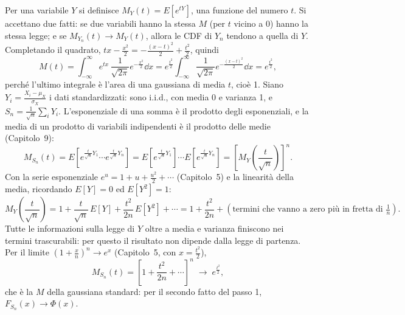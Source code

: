 \begin{dimostrazione}
 Per una variabile $Y$ si definisce $M_Y(t) = E\left[ e^{tY}
\right]$, una funzione del numero $t$. Si accettano due fatti: se due variabili hanno la stessa $M$ (per $t$ vicino a
0) hanno la stessa legge; e se $M_{Y_n}(t) \to M_Y(t)$, allora le CDF di $Y_n$ tendono a quella di $Y$.
 Completando il quadrato, $tx - \frac{x^2}{2} = -\frac{(x - t)^2}{2} +
\frac{t^2}{2}$, quindi
\[ M(t) = \int_{-\infty}^{\infty} e^{tx}\, \frac{1}{\sqrt{2\pi}} e^{-\frac{x^2}{2}} \dd x = e^{\frac{t^2}{2}}
   \int_{-\infty}^{\infty} \frac{1}{\sqrt{2\pi}} e^{-\frac{(x - t)^2}{2}} \dd x = e^{\frac{t^2}{2}} , \]
perché l'ultimo integrale è l'area di una gaussiana di media $t$, cioè 1.
 Siano $Y_i = \frac{X_i - \mu_X}{\sigma_X}$ i dati standardizzati: sono i.i.d., con media 0 e
varianza 1, e $S_n = \frac{1}{\sqrt{n}} \sum_i Y_i$. L'esponenziale di una somma è il prodotto degli esponenziali, e
la media di un prodotto di variabili indipendenti è il prodotto delle medie (Capitolo~9):
\[ M_{S_n}(t) = E\left[ e^{\frac{t}{\sqrt{n}} Y_1} \cdots e^{\frac{t}{\sqrt{n}} Y_n} \right] = E\left[
   e^{\frac{t}{\sqrt{n}} Y_1} \right] \cdots E\left[ e^{\frac{t}{\sqrt{n}} Y_n} \right] = \left[ M_Y\left(
   \frac{t}{\sqrt{n}} \right) \right]^n . \]
 Con la serie esponenziale $e^u = 1 + u + \frac{u^2}{2} + \cdots$
(Capitolo~5) e la linearità della media, ricordando $E[Y] = 0$ ed $E[Y^2] = 1$:
\[ M_Y\left( \frac{t}{\sqrt{n}} \right) = 1 + \frac{t}{\sqrt{n}}\, E[Y] + \frac{t^2}{2n}\, E[Y^2] + \cdots = 1 +
   \frac{t^2}{2n} + (\text{termini che vanno a zero più in fretta di } \tfrac{1}{n}) . \]
Tutte le informazioni sulla legge di $Y$ oltre a media e varianza finiscono nei termini trascurabili: per questo il
risultato non dipende dalla legge di partenza.
 Per il limite $\left( 1 + \frac{x}{n} \right)^n \to e^x$ (Capitolo~5, con $x = \frac{t^2}{2}$),
\[ M_{S_n}(t) = \left[ 1 + \frac{t^2}{2n} + \cdots \right]^n \;\longrightarrow\; e^{\frac{t^2}{2}} , \]
che è la $M$ della gaussiana standard: per il secondo fatto del passo 1, $F_{S_n}(x) \to \Phi(x)$.
\end{dimostrazione}


